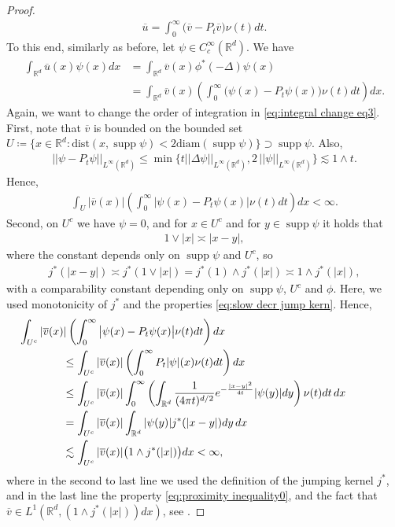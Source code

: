 \documentclass[12pt,a4paper,onecolumn]{amsart}
\DeclareMathOperator\supp{supp}
\theoremstyle{definition}
\newcommand{\R}{\mathbb{R}}
\newcommand{\1}{\mathbf 1}
\newcommand{\LozR}{\phi^*(-\Delta)}
\newcommand{\diam}{\textrm{diam}}
\newcommand{\dist}{\textrm{dist}}
\numberwithin{equation}{section}
\begin{document}
\begin{proof}
\begin{align*}
		\overline u=\int_{0}^\infty\big(\overline v- P_t\overline v\big)\nu(t)dt.
	\end{align*}
	To this end, similarly as before, let $\psi\in C_c^\infty(\R^d)$. We have 
	\begin{align}
		\int_{\R^d} 	\overline u(x)\psi(x)dx&=\int_{\R^d} 	\overline v(x)\LozR\psi(x)\nonumber\\
		&=\int_{\R^d}\overline v(x)\left(\int_0^\infty\big(\psi(x)-P_t\psi(x)\big)\nu(t)dt\right)dx.\label{eq:integral change eq3}
	\end{align}
	Again, we want to change the order of integration in \eqref{eq:integral change eq3}.
	First, note that $\overline v$ is bounded on the bounded set $U\coloneqq \{x\in \R^d:\dist(x,\supp \psi)< 2 \diam (\supp \psi)\}\supset \supp \psi$. Also,
	\begin{align*}
		||\psi-P_t\psi||_{L^\infty(\R^d)}\le \min\{t||\Delta\psi||_{L^\infty(\R^d)},2\,||\psi||_{L^\infty(\R^d)}\}\lesssim 1\wedge t.
	\end{align*}
	Hence,
	\begin{align}\label{eq:overline v integrability no1}
		\int_{U}|\overline v(x)|\left(\int_0^\infty\big|\psi(x)-P_t\psi(x)\big|\nu(t)dt\right)dx<\infty.
	\end{align}
	Second, on $U^c$ we have $\psi=0$, and for $x\in U^c$ and for $y\in \supp \psi$ it holds that
    \begin{align*}
        {1\vee  |x|\asymp|x-y|,}
    \end{align*}
    where the constant depends only on $\supp \psi$ and $U^c$, so
    {\begin{align}\label{eq:proximity inequality0}
        j^*(|x-y|)\asymp j^*(1\vee |x|)=j^*(1)\wedge j^*(|x|)\asymp 1\wedge j^*(|x|),
    \end{align}
    with a comparability constant depending only on $\supp \psi$, $U^c$ and $\phi$. Here, we used monotonicity of $j^*$ and the properties \eqref{eq:slow decr jump kern}.}
    Hence,
	\begin{align}\label{eq:overline v integrability no3}
		&\hspace{-4em}\int_{U^c}|\overline v(x)|\left(\int_0^\infty\big|\psi(x)-P_t\psi(x)\big|\nu(t)dt\right)dx\nonumber\\&\le\int_{U^c}|\overline v(x)|\left(\int_0^\infty P_t|\psi|(x)\nu(t)dt\right)dx\nonumber\\
		&\le \int_{U^c}|\overline v(x)|\int_0^\infty\left( \int_{\R^d}\frac{1}{(4\pi t)^{d/2}}e^{-\frac{|x-y|^2}{4t}}|\psi(y)|dy\right)\nu(t)dt\,dx\nonumber\\
            &=\int_{U^c}|\overline v(x)|\int_{\R^d}|\psi(y)|j^*(|x-y|)dy\, dx\nonumber \\
		&\lesssim  \int_{U^c}|\overline v(x)|\big(1\wedge j^*(|x|)\big)dx<\infty,
	\end{align}
	where in the second to last line we used the definition of the jumping kernel $j^*$, and in the last line the property \eqref{eq:proximity inequality0}, and the fact that $\overline v\in L^1(\R^d,(1\wedge j^*(|x|))dx)$, see \cite[Lemma 2.4]{Bio22}.
	

\end{proof}
\end{document}
